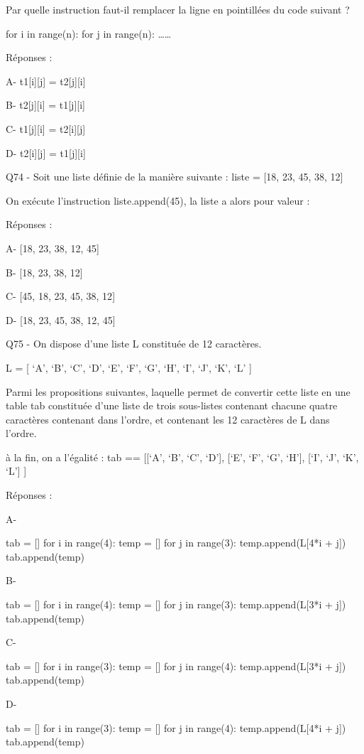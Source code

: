 \documentclass[
]{book}
\begin{document}
Par quelle instruction faut-il remplacer la ligne en pointillées du code suivant ?

for i in range(n):
for j in range(n):
\ldots\ldots{}

Réponses :

A- t1{[}i{]}{[}j{]} = t2{[}j{]}{[}i{]}

B- t2{[}j{]}{[}i{]} = t1{[}j{]}{[}i{]}

C- t1{[}j{]}{[}i{]} = t2{[}i{]}{[}j{]}

D- t2{[}i{]}{[}j{]} = t1{[}j{]}{[}i{]}

Q74 - Soit une liste définie de la manière suivante : liste = {[}18, 23, 45, 38, 12{]}

On exécute l'instruction liste.append(45), la liste a alors pour valeur :

Réponses :

A- {[}18, 23, 38, 12, 45{]}

B- {[}18, 23, 38, 12{]}

C- {[}45, 18, 23, 45, 38, 12{]}

D- {[}18, 23, 45, 38, 12, 45{]}

Q75 - On dispose d'une liste L constituée de 12 caractères.

L = {[} `A', `B', `C', `D', `E', `F', `G', `H', `I', `J', `K', `L' {]}

Parmi les propositions suivantes, laquelle permet de convertir cette liste en une table tab constituée d'une liste de trois sous-listes contenant chacune quatre caractères contenant dans l'ordre, et contenant les 12 caractères de L dans l'ordre.

à la fin, on a l'égalité :
tab == {[}{[}`A', `B', `C', `D'{]},
{[}`E', `F', `G', `H'{]},
{[}`I', `J', `K', `L'{]} {]}

Réponses :

A-

tab = {[}{]}
for i in range(4):
temp = {[}{]}
for j in range(3):
temp.append(L{[}4*i + j{]})
tab.append(temp)

B-

tab = {[}{]}
for i in range(4):
temp = {[}{]}
for j in range(3):
temp.append(L{[}3*i + j{]})
tab.append(temp)

C-

tab = {[}{]}
for i in range(3):
temp = {[}{]}
for j in range(4):
temp.append(L{[}3*i + j{]})
tab.append(temp)

D-

tab = {[}{]}
for i in range(3):
temp = {[}{]}
for j in range(4):
temp.append(L{[}4*i + j{]})
tab.append(temp)
\end{document}
